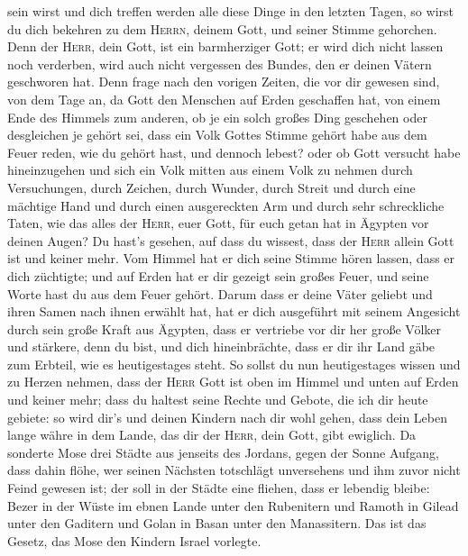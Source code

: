 sein wirst und dich treffen werden alle diese Dinge in den letzten
Tagen, so wirst du dich bekehren zu dem \textsc{Herrn}, deinem Gott, und
seiner Stimme gehorchen.  Denn der \textsc{Herr}, dein
Gott, ist ein barmherziger Gott; er wird dich nicht lassen noch
verderben, wird auch nicht vergessen des Bundes, den er deinen Vätern
geschworen hat.  Denn frage nach den vorigen Zeiten, die
vor dir gewesen sind, von dem Tage an, da Gott den Menschen auf Erden
geschaffen hat, von einem Ende des Himmels zum anderen, ob je ein solch
großes Ding geschehen oder desgleichen je gehört sei, 
dass ein Volk Gottes Stimme gehört habe aus dem Feuer reden, wie du
gehört hast, und dennoch lebest?  oder ob Gott versucht
habe hineinzugehen und sich ein Volk mitten aus einem Volk zu nehmen
durch Versuchungen, durch Zeichen, durch Wunder, durch Streit und durch
eine mächtige Hand und durch einen ausgereckten Arm und durch sehr
schreckliche Taten, wie das alles der \textsc{Herr}, euer Gott, für euch
getan hat in Ägypten vor deinen Augen?  Du hast's
gesehen, auf dass du wissest, dass der \textsc{Herr} allein Gott ist und
keiner mehr.  Vom Himmel hat er dich seine Stimme hören
lassen, dass er dich züchtigte; und auf Erden hat er dir gezeigt sein
großes Feuer, und seine Worte hast du aus dem Feuer gehört.
 Darum dass er deine Väter geliebt und ihren Samen nach
ihnen erwählt hat, hat er dich ausgeführt mit seinem Angesicht durch
sein große Kraft aus Ägypten,  dass er vertriebe vor dir
her große Völker und stärkere, denn du bist, und dich hineinbrächte,
dass er dir ihr Land gäbe zum Erbteil, wie es heutigestages steht.
 So sollst du nun heutigestages wissen und zu Herzen
nehmen, dass der \textsc{Herr} Gott ist oben im Himmel und unten auf
Erden und keiner mehr;  dass du haltest seine Rechte und
Gebote, die ich dir heute gebiete: so wird dir's und deinen Kindern nach
dir wohl gehen, dass dein Leben lange währe in dem Lande, das dir der
\textsc{Herr}, dein Gott, gibt ewiglich.  Da sonderte
Mose drei Städte aus jenseits des Jordans, gegen der Sonne Aufgang,
 dass dahin flöhe, wer seinen Nächsten totschlägt
unversehens und ihm zuvor nicht Feind gewesen ist; der soll in der
Städte eine fliehen, dass er lebendig bleibe:  Bezer in
der Wüste im ebnen Lande unter den Rubenitern und Ramoth in Gilead unter
den Gaditern und Golan in Basan unter den Manassitern. 
Das ist das Gesetz, das Mose den Kindern Israel vorlegte.
